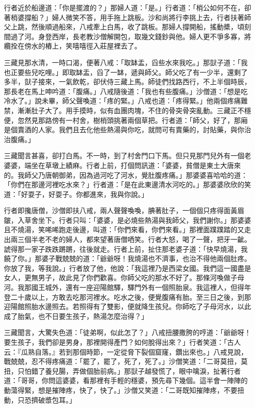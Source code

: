 行者近於船邊道：「你是擺渡的？」那婦人道：「是。」行者道：「梢公如何不在，卻著梢婆撐船？」婦人微笑不答，用手拖上跳板。沙和尚將行李挑上去，行者扶著師父上跳，然後順過船來，八戒牽上白馬，收了跳板。那婦人撐開船，搖動槳，頃刻間過了河。身登西岸，長老教沙僧解開包，取幾文錢鈔與他。婦人更不爭多寡，將纜拴在傍水的樁上，笑嘻嘻徑入莊屋裡去了。

三藏見那水清，一時口渴，便著八戒：「取缽盂，舀些水來我吃。」那獃子道：「我也正要些兒吃哩。」即取缽盂，舀了一缽，遞與師父。師父吃了有一少半，還剩了多半，獃子接來，一氣飲乾，卻伏侍三藏上馬。師徒們找路西行，不上半個時辰，那長老在馬上呻吟道：「腹痛。」八戒隨後道：「我也有些腹痛。」沙僧道：「想是吃冷水了。」說未畢，師父聲喚道：「疼的緊。」八戒也道：「疼得緊。」他兩個疼痛難禁，漸漸肚子大了。用手摸時，似有血團肉塊，不住的骨突骨突亂動。三藏正不穩便，忽然見那路傍有一村舍，樹梢頭挑著兩個草把。行者道：「師父，好了，那廂是個賣酒的人家。我們且去化他些熱湯與你吃，就問可有賣藥的，討貼藥，與你治治腹痛。」

三藏聞言甚喜，卻打白馬。不一時，到了村舍門口下馬。但只見那門兒外有一個老婆婆，端坐在草墩上績麻。行者上前，打個問訊道：「婆婆，貧僧是東土大唐來的。我師父乃唐朝御弟，因為過河吃了河水，覺肚腹疼痛。」那婆婆喜哈哈的道：「你們在那邊河裡吃水來？」行者道：「是在此東邊清水河吃的。」那婆婆欣欣的笑道：「好耍子，好耍子。你都進來，我與你說。」

行者即攙唐僧，沙僧即扶八戒，兩人聲聲喚喚，腆著肚子，一個個只疼得面黃眉皺，入草舍坐下。行者只叫：「婆婆，是必燒些熱湯與我師父，我們謝你。」那婆婆且不燒湯，笑唏唏跑走後邊，叫道：「你們來看，你們來看。」那裡面蹼蹼踏的又走出兩三個半老不老的婦人，都來望著唐僧哂笑。行者大怒，喝了一聲，把牙一齜。諕得那一家子跌跌蹡蹡，往後就走。行者上前，扯住那老婆子道：「快早燒湯，我饒了你。」那婆子戰兢兢的道：「爺爺呀！我燒湯也不濟事，也治不得他兩個肚疼。你放了我，等我說。」行者放了他，他說：「我這裡乃是西梁女國。我們這一國盡是女人，更無男子，故此見了你們歡喜。你師父吃的那水不好了。那條河喚做子母河。我那國王城外，還有一座迎陽館驛，驛門外有一個照胎泉。我這裡人，但得年登二十歲以上，方敢去吃那河裡水。吃水之後，便覺腹痛有胎。至三日之後，到那迎陽館照胎水邊照去。若照得有了雙影，便就降生孩兒。你師吃了子母河水，以此成了胎氣，也不日要生孩子，熱湯怎麼治得？」

三藏聞言，大驚失色道：「徒弟啊，似此怎了？」八戒扭腰撒胯的哼道：「爺爺呀！要生孩子，我們卻是男身，那裡開得產門？如何脫得出來？」行者笑道：「古人云：『瓜熟自落。』若到那個時節，一定從脅下裂個窟窿，鑽出來也。」八戒見說，戰兢兢，忍不得疼痛道：「罷了，罷了，死了，死了。」沙僧笑道：「二哥莫扭，莫扭，只怕錯了養兒腸，弄做個胎前病。」那獃子越發慌了，眼中噙淚，扯著行者道：「哥哥，你問這婆婆，看那裡有手輕的穩婆，預先尋下幾個。這半會一陣陣的動蕩得緊，想是摧陣疼，快了，快了。」沙僧又笑道：「二哥既知摧陣疼，不要扭動，只恐擠破漿包耳。」

